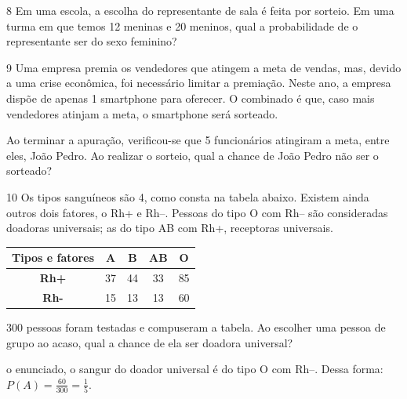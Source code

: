 {{{\begin{escolha}
{{{{\begin{escolha}
\begin{escolha}
{{\begin{enumerate}
{{\num{8} Em uma escola, a escolha do representante de sala é feita por sorteio.
Em uma turma em que temos 12 meninas e 20 meninos, qual a probabilidade
de o representante ser do sexo feminino?



\num{9} Uma empresa premia os vendedores que atingem a meta de
vendas, mas, devido a uma crise econômica, foi necessário limitar a 
premiação. Neste ano, a empresa dispõe de apenas 1 smartphone para 
oferecer. O combinado é que, caso mais vendedores atinjam 
a meta, o smartphone será sorteado.

Ao terminar a apuração, verificou-se que 5 funcionários atingiram a
meta, entre eles, João Pedro. Ao realizar o sorteio, qual a chance de
João Pedro não ser o sorteado?



\num{10} Os tipos sanguíneos são 4, como consta na tabela abaixo. Existem ainda
outros dois fatores, o Rh+ e Rh--. Pessoas do tipo O com Rh-- são consideradas 
doadoras universais; as do tipo AB com Rh+, receptoras universais.

\begin{table}[]
\begin{tabular}{|c|c|c|c|c|}
\hline
\rowcolor[HTML]{FFCCC9} 
\textbf{Tipos e fatores} & \textbf{A} & \textbf{B} & \textbf{AB} & \textbf{O} \\ \hline
\cellcolor[HTML]{FFCCC9}\textbf{Rh+} & 37 & 44 & 33 & 85 \\ \hline
\cellcolor[HTML]{FFCCC9}\textbf{Rh-} & 15 & 13 & 13 & 60 \\ \hline
\end{tabular}
\end{table}

300 pessoas foram testadas e compuseram a tabela. Ao escolher uma pessoa
de grupo ao acaso, qual a chance de ela ser doadora universal?

o enunciado, o sangur do doador universal é do tipo O com Rh--. 
Dessa forma: $P(A) = \frac{60}{300} = \frac{1}{5}$.}

}
\end{enumerate}}}
\end{escolha}
\end{escolha}}}}}
\end{escolha}}}}
